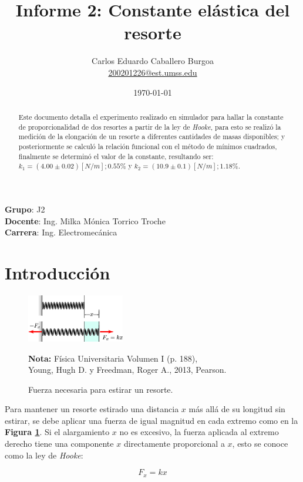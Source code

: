 \documentclass[letter,11pt]{article}
\title{Informe 2: Constante elástica del resorte}
\author{Carlos Eduardo Caballero Burgoa \\
    \small{\href{mailto:200201226@est.umss.edu}{200201226@est.umss.edu}}
}
\date{\today}
\newcommand{\source}[1]{\vspace{-11pt} \caption*{\small{\textbf{Nota:} {#1}}}}
\begin{document}
\maketitle
\begin{center}
    \textbf{Grupo}: J2\\
    \textbf{Docente}: Ing. Milka Mónica Torrico Troche\\
    \textbf{Carrera}: Ing. Electromecánica
\end{center}

\begin{abstract}
Este documento detalla el experimento realizado en simulador para hallar la
constante de proporcionalidad de dos resortes a partir de la ley de
\emph{Hooke}, para esto se realizó la medición de la elongación de un resorte a
diferentes cantidades de masas disponibles; y posteriormente se calculó la 
relación funcional con el método de mínimos cuadrados, finalmente se determinó
el valor de la constante, resultando ser: $k_1 = (4.00 \pm 0.02)[N/m]; 0.55\%$ y
$k_2 = (10.9 \pm 0.1)[N/m]; 1.18\%$.
\end{abstract}

\section{Introducción}

\begin{figure}
\centering
\includegraphics[width=0.38\textwidth]{resources/f1.eps}
\caption{Fuerza necesaria para estirar un resorte.}
\label{figura1}
\source{Física Universitaria Volumen I (p. 188), \\
Young, Hugh D. y Freedman, Roger A., 2013, Pearson.}
\end{figure}

Para mantener un resorte estirado una distancia $x$ más allá de su longitud sin
estirar, se debe aplicar una fuerza de igual magnitud en cada extremo como en la
\textbf{Figura \ref{figura1}}. Si el alargamiento $x$ no es excesivo, la fuerza
aplicada al extremo derecho tiene una componente $x$ directamente proporcional
a $x$, esto se conoce como la ley de \emph{Hooke}:

\begin{equation}
    F_x = k x
\label{hooke}
\end{equation}
\vspace{0.10cm}
\end{document}
